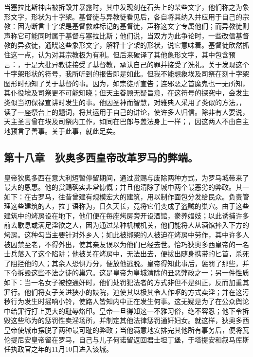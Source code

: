 当塞拉比斯神庙被拆毁并暴露时，其中发现刻在石头上的某些文字，他们称之为象形文字，形状为十字架。基督徒与异教徒看见后，各自将其纳入并应用于自己的宗教：因为断言十字架是基督救难标记的基督徒，声称这文字专属他们；而异教徒则声称它可能同时属于基督与塞拉比斯；他们说，当双方为此争论时，一些改信基督教的异教徒，通晓这些象形文字，解释十字架的形状，说它意味着。基督徒欣然抓住这一点，认为对其宗教极为有利。但后来破译了其他象形文字，其中包含预言：，于是大批异教徒接受了基督教，承认自己的罪并接受了洗礼。关于发现这个十字架形状的符号，我所听到的报告即是如此。但我不能想象埃及司祭在刻十字架图形时预知了关于基督的事。因为，如宗徒所宣告；连邪恶之首魔鬼也一无所知，其仆役埃及司祭更不可能知晓；但天主眷顾无疑旨意，在这符号的探究中，会发生类似当初保禄宣讲时发生的事。他因圣神而智慧，对雅典人采用了类似的方法，，读了一座祭台上的题词，将其运用于自己的讲论，使许多人归信。除非有人要说，天主圣言曾在埃及司祭内工作，如同在巴郎与盖法身上一样；，因这两人不由自主地预言了善事。关于此事，就此足矣。\par


\subsection{第十八章　狄奥多西皇帝改革罗马的弊端。}

皇帝狄奥多西在意大利短暂停留期间，通过赏赐与废除两种方式，为罗马城带来了最大的恩惠。他的赏赐确实非常慷慨；并且他清除了城中两个最恶劣的弊政。其一如下：在古罗马，往昔曾建有规模宏大的建筑，用以制作面包分发给民众。负责管理这些建筑的人，拉丁语称为，日久天长，竟将它们变成了盗贼的巢穴。由于这些建筑中的烤房设在地下，他们便在每座烤房旁开设酒馆，豢养娼妓；以此诱捕许多前去歇息或满足淫欲之人，因为通过某种机械机关，他们能将人从酒馆摔入下方的烤房。这种勾当主要针对外乡人；如此被绑架的人被迫在烤房中劳作，其中许多人被囚禁至老，不得外出，使其亲友误以为他们已经去世。恰巧狄奥多西皇帝的一名士兵落入了这个陷阱；他被关在烤房中，无法出去，便拔出随身携带的匕首，杀死了阻拦他的人；其余人恐惧万分，便放他逃脱。皇帝得知此事后，惩罚了那些，并下令拆毁这些不法之徒的巢穴。这是皇帝为皇城清除的丑恶弊政之一；另一件性质如下：当一名女子被控通奸时，他们处罚犯法者的方式非但不是纠正，反而加重其罪行。他们将女子关进狭小的妓院，迫使其以极其令人作呕的方式卖淫；并在这污秽行为发生时摇响小铃，使路人皆知内中正在发生何事。这无疑是为了在公众舆论中给罪行打上更大的耻辱烙印。皇帝一旦得知这一不雅习俗，绝不容忍；他下令拆毁这些称为的惩罚性卖淫场所，并制定其他法律惩罚通奸妇女。就这样，狄奥多西皇帝使城市摆脱了两种最可耻的弊政；当他满意地安排完其他所有事务后，便将瓦伦提尼安皇帝留在罗马，自己与儿子何诺留返回君士坦丁堡，于塔提安和叙马库斯任执政官之年的11月10日进入该城。\par

